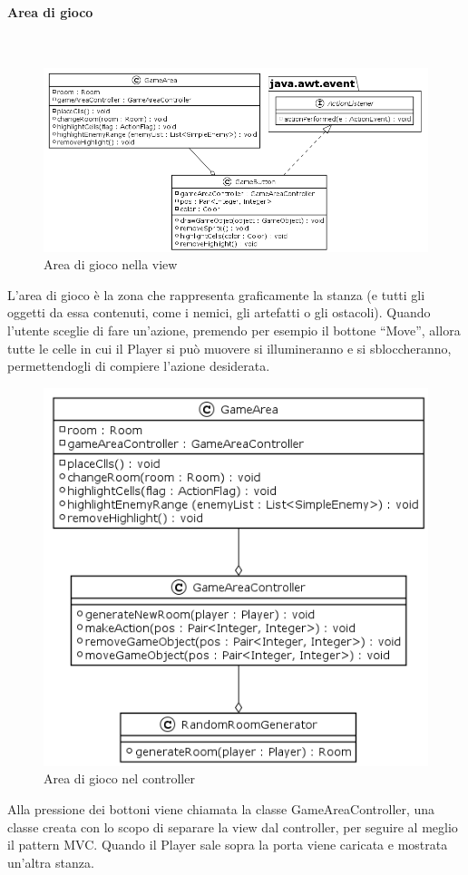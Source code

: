 \documentclass[a4paper,titlepage,12pt]{article}
\begin{document}
\paragraph{Area di gioco}
\par \noindent \\
\begin{figure}[H]
    \centering
    \includegraphics[scale=0.5]{img/uml/GameArea.png}
    \caption{Area di gioco nella view}
    \label{fig: Game Area nella view}
\end{figure}
\par \noindent L’area di gioco è la zona che rappresenta graficamente la stanza (e tutti gli oggetti da essa contenuti, come i nemici, gli artefatti o gli ostacoli).
Quando l’utente sceglie di fare un’azione, premendo per esempio il bottone “Move”, allora tutte le celle in cui il Player si può muovere si illumineranno e si sbloccheranno, permettendogli di compiere l’azione desiderata.
\begin{figure}[H]
    \centering
    \includegraphics[scale=0.7]{img/uml/GameArea2.png}
    \caption{Area di gioco nel controller}
    \label{fig: Game Area nel controller}
\end{figure}
\par \noindent Alla pressione dei bottoni viene chiamata la classe GameAreaController, una classe creata con lo scopo di separare la view dal controller, per seguire al meglio il pattern MVC.
Quando il Player sale sopra la porta viene caricata e mostrata un'altra stanza.
\end{document}
